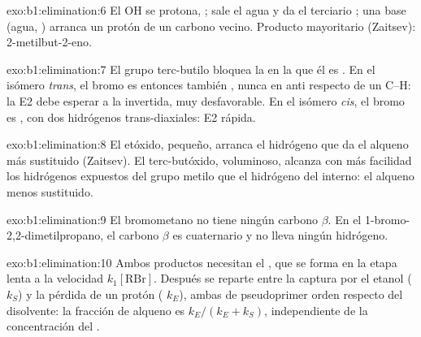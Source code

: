 \begin{solution}{exo:b1:elimination:6}
El OH se protona, ; sale el agua y da el  terciario
; una base (agua, ) arranca un protón de un
carbono vecino. Producto mayoritario (Zaitsev): 2-metilbut-2-eno.
\end{solution}

\begin{solution}{exo:b1:elimination:7}
El grupo terc-butilo bloquea la  en la que él es . En el
isómero \textit{trans}, el bromo es entonces también , nunca en
anti respecto de un C--H: la E2 debe esperar a la  invertida, muy
desfavorable. En el isómero \textit{cis}, el bromo es , con dos
hidrógenos trans-diaxiales: E2 rápida.
\end{solution}

\begin{solution}{exo:b1:elimination:8}
El etóxido, pequeño, arranca el hidrógeno que da el alqueno más
sustituido (Zaitsev). El terc-butóxido, voluminoso, alcanza con más
facilidad los hidrógenos expuestos del grupo metilo que el hidrógeno del
 interno: el alqueno menos sustituido.
\end{solution}

\begin{solution}{exo:b1:elimination:9}
El bromometano no tiene ningún carbono $\beta$. En el
1-bromo-2,2-dimetilpropano, el carbono $\beta$ es cuaternario y no lleva
ningún hidrógeno.
\end{solution}

\begin{solution}{exo:b1:elimination:10}
Ambos productos necesitan el , que se forma en la etapa lenta
a la velocidad $k_1[\mathrm{RBr}]$. Después se reparte entre la captura
por el etanol ( $k_S$) y la pérdida de un protón
( $k_E$), ambas de pseudoprimer orden respecto del
disolvente: la fracción de alqueno es $k_E/(k_E + k_S)$, independiente de
la concentración del .
\end{solution}

